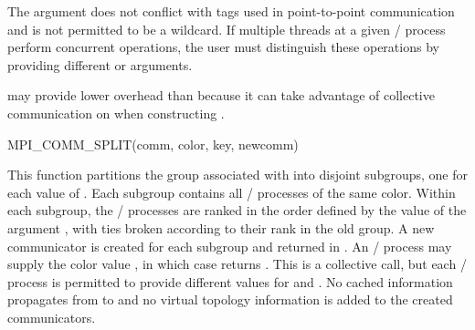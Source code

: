 The  argument does not conflict with tags used in
point-to-point communication and is not permitted to be a wildcard. If
multiple threads at a given \MPI/ process perform concurrent
 operations, the user must
distinguish these operations by providing different  or
 arguments.

\begin{users}
 may provide lower overhead than
 because it can take advantage of
collective communication on  when constructing .
\end{users}

%
\begin{funcdef}{MPI\_COMM\_SPLIT}{(\mbox{comm}, \mbox{color}, \mbox{key}, \mbox{newcomm})}
\end{funcdef}

\noindent This function partitions the group associated with 
into disjoint subgroups, one for each value of . Each subgroup
contains all \MPI/ processes of the same color. Within each subgroup, the \MPI/ processes
are ranked in the order defined by the value of the argument ,
with ties broken according to their rank in the old group. A new communicator
is created for each subgroup and returned in . An \MPI/ process may
supply the color value , in which case 
returns . This is a collective call, but each \MPI/ process
is permitted to provide different values for  and .
No cached information propagates from  to  and no
virtual topology information is added to the created communicators.

